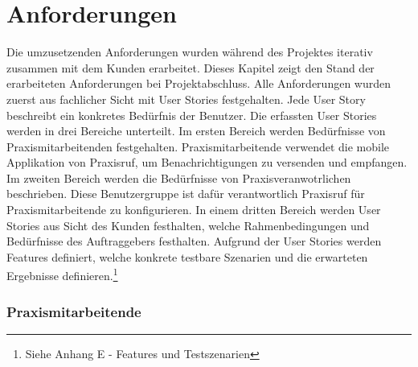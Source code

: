 \section{Anforderungen}\label{sec:anforderungen}

Die umzusetzenden Anforderungen wurden während des Projektes iterativ zusammen mit dem Kunden erarbeitet.
Dieses Kapitel zeigt den Stand der erarbeiteten Anforderungen bei Projektabschluss.
Alle Anforderungen wurden zuerst aus fachlicher Sicht mit User Stories festgehalten.
Jede User Story beschreibt ein konkretes Bedürfnis der Benutzer.
Die erfassten User Stories werden in drei Bereiche unterteilt.
Im ersten Bereich werden Bedürfnisse von Praxismitarbeitenden festgehalten.
Praxismitarbeitende verwendet die mobile Applikation von Praxisruf, um Benachrichtigungen zu versenden und empfangen.
Im zweiten Bereich werden die Bedürfnisse von Praxisveranwotrlichen beschrieben.
Diese Benutzergruppe ist dafür verantwortlich Praxisruf für Praxismitarbeitende zu konfigurieren.
In einem dritten Bereich werden User Stories aus Sicht des Kunden festhalten, welche Rahmenbedingungen und Bedürfnisse des Auftraggebers festhalten.
Aufgrund der User Stories werden Features definiert, welche konkrete testbare Szenarien und die erwarteten Ergebnisse definieren.\footnote{Siehe Anhang E - Features und Testszenarien}

\subsubsection*{Praxismitarbeitende}

